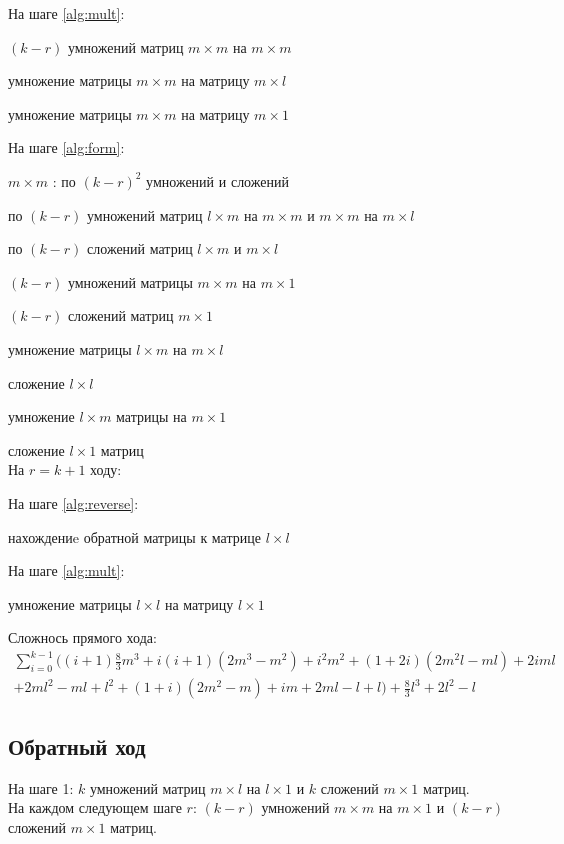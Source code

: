 \documentclass[12pt]{report}
\begin{document}
        На шаге \ref{alg:mult}: \par
            \quad $(k - r)$ умножений матриц $m \times m$ на $m \times m$  \par
             умножение матрицы $m \times m$ на матрицу $m \times l$ \par
             умножение матрицы $m \times m$ на матрицу $m \times 1$

        На шаге \ref{alg:form}: \par
            \quad $m \times m$ : по $(k - r)^2$ умножений и сложений        \par
            \quad по $(k - r)$ умножений матриц $l \times m$ на $m \times m$
                                              и $m \times m$ на $m \times l$ \par
            \quad по $(k - r)$ сложений матриц $l \times m$ и $m \times l$   \par
            \quad $(k - r)$ умножений матрицы $m \times m$ на $m \times 1$   \par
            \quad $(k - r)$ сложений матриц $m \times 1$                     \par
             умножение матрицы $l \times m$ на $m \times l$           \par
             сложение $l \times l$                                    \par
             умножение $l \times m$ матрицы на $m \times 1$           \par
             сложение $l \times 1$ матриц                             \\
        На $r = k + 1$ ходу:    

        На шаге \ref{alg:reverse}: \par
             нахождениe обратной матрицы к матрице $l \times l$
        
        На шаге \ref{alg:mult}: \par
             умножение матрицы $l \times l$ на матрицу $l \times 1$

        Сложнось прямого хода:
        \begin{multline*}
            \sum_{i=0}^{k-1} ((i + 1) \frac{8}{3}m^3 + i(i + 1) (2m^3 - m^2) + i^2m^2 + (1+2i)(2m^2l-ml) + 2iml \\ + 2ml^2 - ml + l^2 + (1 + i)(2m^2-m) + im + 2ml - l + l) + \frac{8}{3}l^3+2l^2-l
        \end{multline*}
        \subsection{Обратный ход}
        На шаге 1: $k$ умножений матриц $m \times l$ на $l \times 1$ и $k$ сложений $m \times 1$ матриц. \\
        На каждом следующем шаге $r$: $(k - r)$ умножений $m \times m$ на $m \times 1$ и $(k - r)$ сложений $m \times 1$
        матриц.
\end{document}
